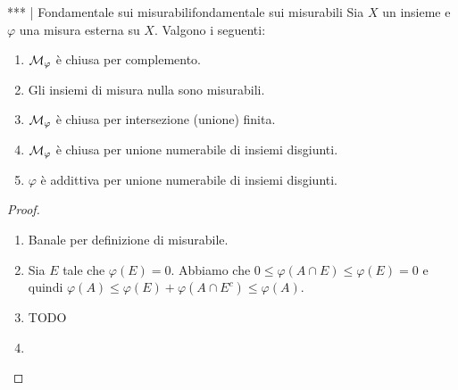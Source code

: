 \begin{theorem}{*** | Fondamentale sui misurabili}{fondamentale sui misurabili}
    Sia $X$ un insieme e $\varphi$ una misura esterna su $X$. Valgono i seguenti:\begin{enumerate}
        \item $\mathcal{M}_\varphi$ è chiusa per complemento.
        \item Gli insiemi di misura nulla sono misurabili.
        \item $\mathcal{M}_\varphi$ è chiusa per intersezione (unione) finita.
        \item $\mathcal{M}_\varphi$ è chiusa per unione numerabile di insiemi disgiunti.
        \item $\varphi$ è addittiva per unione numerabile di insiemi disgiunti.
    \end{enumerate}
    \begin{proof}
        \begin{enumerate}
            \item Banale per definizione di misurabile.
            \item Sia $E$ tale che $\varphi(E) = 0$. Abbiamo che $0\leq \varphi(A\cap E)\leq \varphi(E)=0$ e quindi $\varphi(A) \leq \varphi(E) + \varphi(A \cap E^c)\leq \varphi(A)$.
            \item TODO
            \item 
        \end{enumerate}
    \end{proof}
\end{theorem}